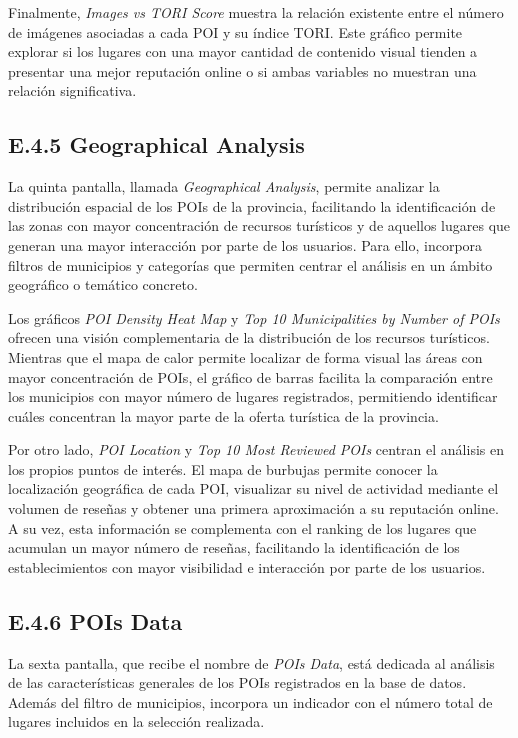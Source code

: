 Finalmente, \textit{Images vs TORI Score} muestra la relación existente entre el número de imágenes asociadas a cada POI y su índice TORI. Este gráfico permite explorar si los lugares con una mayor cantidad de contenido visual tienden a presentar una mejor reputación online o si ambas variables no muestran una relación significativa.


\subsection{E.4.5 Geographical Analysis}
La quinta pantalla, llamada \textit{Geographical Analysis}, permite analizar la distribución espacial de los POIs de la provincia, facilitando la identificación de las zonas con mayor concentración de recursos turísticos y de aquellos lugares que generan una mayor interacción por parte de los usuarios. Para ello, incorpora filtros de municipios y categorías que permiten centrar el análisis en un ámbito geográfico o temático concreto.

Los gráficos \textit{POI Density Heat Map} y \textit{Top 10 Municipalities by Number of POIs} ofrecen una visión complementaria de la distribución de los recursos turísticos. Mientras que el mapa de calor permite localizar de forma visual las áreas con mayor concentración de POIs, el gráfico de barras facilita la comparación entre los municipios con mayor número de lugares registrados, permitiendo identificar cuáles concentran la mayor parte de la oferta turística de la provincia.

Por otro lado, \textit{POI Location} y \textit{Top 10 Most Reviewed POIs} centran el análisis en los propios puntos de interés. El mapa de burbujas permite conocer la localización geográfica de cada POI, visualizar su nivel de actividad mediante el volumen de reseñas y obtener una primera aproximación a su reputación online. A su vez, esta información se complementa con el ranking de los lugares que acumulan un mayor número de reseñas, facilitando la identificación de los establecimientos con mayor visibilidad e interacción por parte de los usuarios.


\subsection{E.4.6 POIs Data}
La sexta pantalla, que recibe el nombre de \textit{POIs Data}, está dedicada al análisis de las características generales de los POIs registrados en la base de datos. Además del filtro de municipios, incorpora un indicador con el número total de lugares incluidos en la selección realizada.

